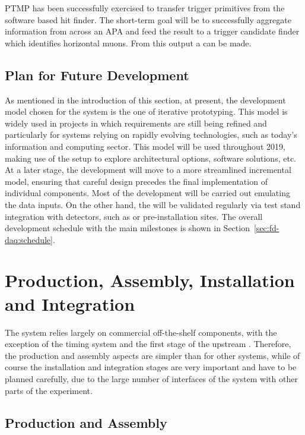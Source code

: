 PTMP has been successfully exercised to transfer trigger primitives from the software based hit finder. The short-term goal will be to successfully aggregate information from across an APA and feed the result to a trigger candidate finder which identifies horizontal muons. From this output a  can be made.

\subsection{Plan for Future Development}
\label{sec:sp-daq:design-plans}

As mentioned in the introduction of this section, at present, the development model chosen for the  system is the one of iterative prototyping.
This model is widely used in projects in which requirements are still
being refined and particularly for systems relying on rapidly evolving technologies, such as today's information and computing sector. 
This model will be used throughout 2019, making use of the  setup to explore architectural options, software solutions, etc.
At a later stage, the  development will move to a more streamlined incremental model, ensuring that careful design precedes the final implementation of individual components.
Most of the development will be carried out emulating the data inputs.
On the other hand, the  will be validated regularly via test stand integration with detectors, such as  or pre-installation sites.
The overall development schedule with the main  milestones is shown in Section~\ref{sec:fd-daq:schedule}.

\section{Production, Assembly, Installation and Integration}
\label{sec:sp-daq:production}

The  system relies largely on commercial off-the-shelf components, with the exception of the timing system and the first stage of the upstream .
Therefore, the production and assembly aspects are simpler than for other systems, while of course the installation and integration stages are very important and have to be planned carefully, due to the large number of interfaces of the  system with other parts of the experiment.

\subsection{Production and Assembly}
